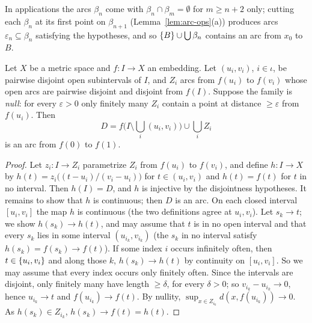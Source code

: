 
In applications the arcs $\beta_n$ come with $\beta_n\cap\beta_m=\emptyset$ for $m\ge n+2$ only;
cutting each $\beta_n$ at its first point on $\beta_{n+1}$ (Lemma~\ref{lem:arc-ops}(a)) produces arcs
$\varepsilon_n\subseteq\beta_n$ satisfying the hypotheses, and so $\left\{ B \right\}\cup\bigcup\beta_n$ contains
an arc from $x_0$ to $B$.

\begin{theorem}\label{thm:arc-replace}
Let $X$ be a metric space and $f\colon I\to X$ an embedding. Let $(u_i,v_i)$, $i\in\iota$, be
pairwise disjoint open subintervals of $I$, and $Z_i$ arcs from $f(u_i)$ to $f(v_i)$ whose open
arcs are pairwise disjoint and disjoint from $f(I)$. Suppose the family is \emph{null}: for every
$\varepsilon>0$ only finitely many $Z_i$ contain a point at distance $\ge\varepsilon$ from
$f(u_i)$. Then
\[
D=f\Big(I\setminus\bigcup_i(u_i,v_i)\Big)\cup\bigcup_i Z_i
\]
is an arc from $f(0)$ to $f(1)$.
\end{theorem}

\begin{proof}
Let $z_i\colon I\to Z_i$ parametrize $Z_i$ from $f(u_i)$ to $f(v_i)$, and define $h\colon I\to X$
by $h(t)=z_i\big((t-u_i)/(v_i-u_i)\big)$ for $t\in(u_i,v_i)$ and $h(t)=f(t)$ for $t$ in no interval.
Then $h(I)=D$, and $h$ is injective by the disjointness hypotheses. It remains to show that $h$ is
continuous; then $D$ is an arc. On each closed interval $[u_i,v_i]$ the map $h$ is continuous (the
two definitions agree at $u_i,v_i$). Let $s_k\to t$; we show $h(s_k)\to h(t)$, and may assume that
$t$ is in no open interval and that every $s_k$ lies in some interval $(u_{i_k},v_{i_k})$ (the
$s_k$ in no interval satisfy $h(s_k)=f(s_k)\to f(t)$). If some index $i$ occurs infinitely often,
then $t\in\left\{ u_i,v_i \right\}$ and along those $k$, $h(s_k)\to h(t)$ by continuity on $[u_i,v_i]$. So we
may assume that every index occurs only finitely often. Since the intervals are disjoint, only
finitely many have length $\ge\delta$, for every $\delta>0$; so $v_{i_k}-u_{i_k}\to0$, hence
$u_{i_k}\to t$ and $f(u_{i_k})\to f(t)$. By nullity, $\sup_{x\in Z_{i_k}}d(x,f(u_{i_k}))\to0$. As
$h(s_k)\in Z_{i_k}$, $h(s_k)\to f(t)=h(t)$.
\end{proof}


